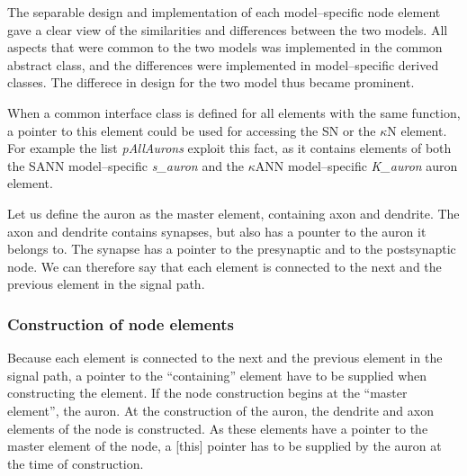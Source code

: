 	The separable design and implementation of each model--specific node element gave a clear view of the similarities and differences between the two models.
	All aspects that were common to the two models was implemented in the common abstract class, and the differences were implemented in model--specific derived classes.
	The differece in design for the two model thus became prominent.


	
	When a common interface class is defined for all elements with the same function, a pointer to this element could be used for accessing the SN or the $\kappa$N element.
	For example the list \emph{pAllAurons} exploit this fact, as it contains elements of both the SANN model--specific \emph{s\_auron} and the $\kappa$ANN model--specific \emph{K\_auron} auron element.



	Let us define the auron as the master element, containing axon and dendrite. 
	The axon and dendrite contains synapses, but also has a pounter to the auron it belongs to. The synapse has a pointer to the presynaptic and to the postsynaptic node.
	We can therefore say that each element is connected to the next and the previous element in the signal path.





	\subsubsection{Construction of node elements} 
	Because each element is connected to the next and the previous element in the signal path, a pointer to the ``containing'' element have to be supplied when constructing the element.
	If the node construction begins at the ``master element'', the auron.
	At the construction of the auron, the dendrite and axon elements of the node is constructed.
	As these elements have a pointer to the master element of the node, a [this] pointer has to be supplied by the auron at the time of construction. %

